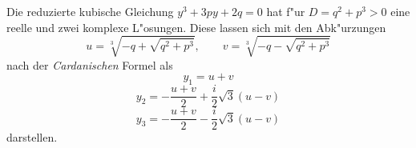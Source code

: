 \documentclass[fleqn]{article}
\begin{document}
\setlength{\mathindent}{2cm}

Die reduzierte kubische Gleichung $y^3 + 3py +2q = 0$ hat f"ur
$D = q^2 + p^3 > 0$
eine reelle und zwei komplexe L"osungen. Diese lassen sich mit den Abk"urzungen
\[ u = \sqrt[3]{-q + \sqrt{q^2+p^3}},\qquad v = \sqrt[3]{-q - \sqrt{q^2+p^3}} \]
nach der \emph{Cardanischen} Formel als
\begin{equation} y_1 = u + v \end{equation}
\begin{equation}
   y_2 = -\frac{u+v}{2} + \frac{i}{2}\sqrt{3}(u - v)
\end{equation}
\begin{equation}
   y_3 = -\frac{u+v}{2} - \frac{i}{2}\sqrt{3}(u-v)
\end{equation}
darstellen.
\end{document}
